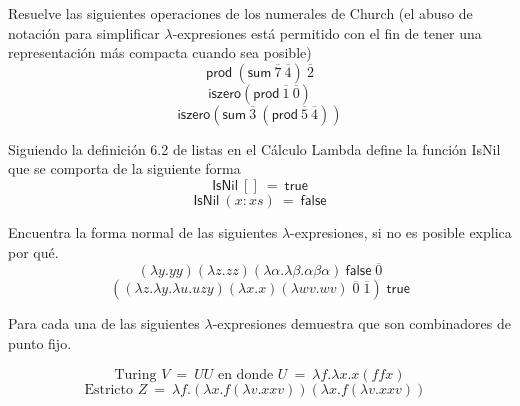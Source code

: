                 \begin{exercise}
                    Resuelve las siguientes operaciones de los numerales de Church (el abuso de notación para simplificar $\lambda$-expresiones está permitido con el fin de tener una representación más compacta cuando sea posible)
                    \[
                            \textsf{prod}\ (\textsf{sum}\ \overline{7}\ \overline{4})\ \overline{2}
                    \]
                    \[
                            \textsf{iszero} (\textsf{prod}\ \overline{1}\ \overline{0})
                    \]
                    \[
                            \textsf{iszero}( \textsf{sum}\ \overline{3}\ (\textsf{prod}\ \overline{5}\ \overline{4}))
                    \]
                \end{exercise}  


                \begin{exercise}
                    Siguiendo la definición 6.2 de listas en el Cálculo Lambda define la función \textsf{IsNil} que se comporta de la siguiente forma
                    \[ \textsf{IsNil}\ []\ =\ \textsf{true} \]
                    \[ \textsf{IsNil}\ (x:xs)\  =\ \textsf{false}\]
                \end{exercise}


                \begin{exercise}
                    Encuentra la forma normal de las siguientes $\lambda$-expresiones, si no es posible explica por qué.\\
                    \[
                        (\lambda y.yy)(\lambda z.zz)(\lambda \alpha . \lambda \beta . \alpha \beta \alpha)\ \textsf{false} \; \overline{0}
                    \]
                    \[
                        ((\lambda z. \lambda y. \lambda u.uzy)(\lambda x.x)(\lambda wv.wv) \; \overline{0} \; \overline{1}) \; \textsf{true} 
                    \]
                \end{exercise}


                \begin{exercise}
                    Para cada una de las siguientes $\lambda$-expresiones demuestra que son combinadores de punto fijo.
                    

                        \[\text{Turing $V\ =\ UU$ en donde $U\ =\ \lambda f.\lambda x.x(ffx)$}\]
                        \[\text{Estricto $Z\ =\ \lambda f.(\lambda x.f(\lambda v.xxv))(\lambda x.f(\lambda v.xxv))$ }\]
            
                    
                \end{exercise}



